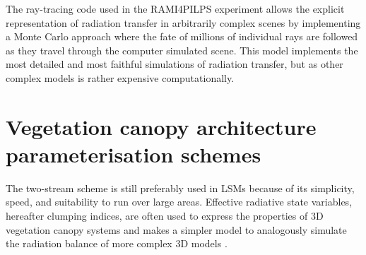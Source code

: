 The ray-tracing code used in the RAMI4PILPS experiment allows the explicit representation of radiation transfer in arbitrarily complex scenes \citep{Govaerts1998} by implementing a Monte Carlo approach where the fate of millions of individual rays are followed as they travel through the computer simulated scene. This model implements the most detailed and most faithful simulations of radiation transfer, but as other complex models is rather expensive computationally.

\section{Vegetation canopy architecture parameterisation schemes}




The two-stream scheme is still preferably used in LSMs because of its simplicity, speed, and suitability to run over large areas. Effective radiative state variables, hereafter clumping indices, are often used to express the properties of 3D vegetation canopy systems and makes a simpler model to analogously simulate the radiation balance of more complex 3D models \citep{Pinty2004,pinty2006}.

